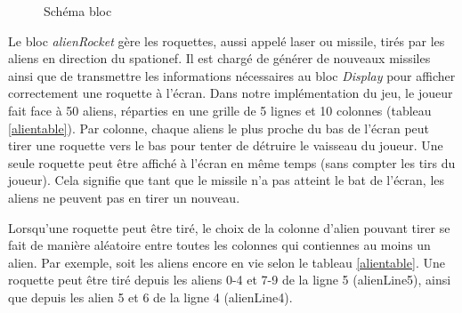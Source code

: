 \documentclass[french]{nakrule}
\begin{document}
\begin{figure}
\caption{Schéma bloc}
\label{alienRocketBloc}
\end{figure}

Le bloc \emph{alienRocket} gère les roquettes, aussi appelé laser ou missile, tirés par
les aliens en direction du spationef. Il est chargé de générer de nouveaux
missiles ainsi que de transmettre les informations nécessaires au bloc \emph{Display} pour afficher
correctement une roquette à l'écran.
Dans notre implémentation du jeu, le joueur fait face à 50 aliens, réparties en
une grille de 5 lignes et 10 colonnes (tableau \ref{alientable}). Par colonne,
chaque aliens le plus proche du bas de l'écran peut tirer une roquette vers le
bas pour tenter de détruire le vaisseau du joueur. Une seule roquette peut être
affiché à l'écran en même temps (sans compter les tirs du joueur). Cela signifie
que tant que le missile n'a pas atteint le bat de l'écran, les aliens ne peuvent
pas en tirer un nouveau.

Lorsqu'une roquette peut être tiré, le choix de la colonne d'alien pouvant tirer
se fait de manière aléatoire entre toutes les colonnes qui contiennes au moins un
alien. Par exemple, soit les aliens encore en vie selon le tableau
\ref{alientable}. Une roquette peut être tiré depuis les aliens 0-4 et 7-9 de la
ligne 5 (alienLine5), ainsi que depuis les alien 5 et 6 de la ligne 4 (alienLine4).
\end{document}
